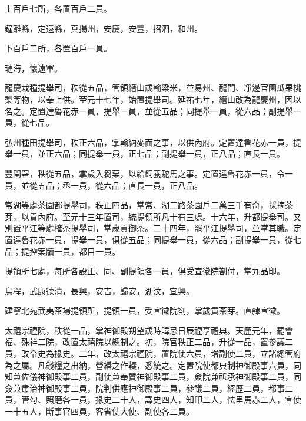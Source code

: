 \begin{pinyinscope}
 上百戶七所，各置百戶二員。



 鐘離縣，定遠縣，真揚州，安慶，安豐，招泗，和州。



 下百戶二所，各置百戶一員。



 璉海，懷遠軍。



 龍慶栽種提舉司，秩從五品，管領縉山歲輸粱米，並易州、龍門、凈邊官園瓜果桃梨等物，以奉上供。至元十七年，始置提舉司。延祐七年，縉山改為龍慶州，因以名之。定置達魯花赤一員，提舉一員，並從五品；同提舉一員，從六品；副提舉一員，從七品。



 弘州種田提舉司，秩正六品，掌輸納麥面之事，以供內府。定置達魯花赤一員，提舉一員，並正六品；同提舉一員，正七品；副提舉一員，正八品；直長一員。



 豐閏署，秩從五品，掌歲入芻粟，以給飼養駝馬之事。定置達魯花赤一員，令一員，並從五品；丞一員，從六品；直長一員，正八品。



 常湖等處茶園都提舉司，秩正四品，掌常、湖二路茶園戶二萬三千有奇，採摘茶芽，以貢內府。至元十三年置司，統提領所凡十有三處。十六年，升都提舉司。又別置平江等處榷茶提舉司，掌歲貢御茶。二十四年，罷平江提舉司，並掌其職。定置達魯花赤一員，提舉一員，俱從五品；同提舉一員，從六品；副提舉一員，從七品；提控案牘一員，都目一員。



 提領所七處，每所各設正、同、副提領各一員，俱受宣徽院劄付，掌九品印。



 烏程，武康德清，長興，安吉，歸安，湖汶，宜興。



 建寧北苑武夷茶場提領所，提領一員，受宣徽院劄，掌歲貢茶芽。直隸宣徽。



 太禧宗禋院，秩從一品，掌神御殿朔望歲時諱忌日辰禋享禮典。天歷元年，罷會福、殊祥二院，改置太禧院以總制之。初，院官秩正二品，升從一品，置參議二員，改令史為掾史。二年，改太禧宗禋院，置院使六員，增副使二員，立諸總管府為之屬。凡錢糧之出納，營繕之作輟，悉統之。定置院使都典制神御殿事六員，同知兼佐儀神御殿事二員，副使兼奉贊神御殿事二員，僉院兼祗承神御殿事二員，同僉兼肅治神御殿事二員，院判供應神御殿事二員，參議二員，經歷二員，都事二員，管勾、照磨各一員，掾史二十人，譯史四人，知印二人，怯里馬赤二人，宣使一十五人，斷事官四員，客省使大使、副使各二員。




\end{pinyinscope}
